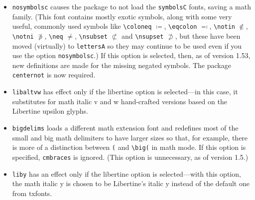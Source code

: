 \documentclass[\fsc]{article}
\theoremstyle{oldplain}
\theoremstyle{plain}
\begin{document}
\begin{itemize}
\item {\tt nosymbolsc} causes the package to not load the {\tt symbolsC} fonts, saving  a math family. (This font contains mostly exotic symbols, along with some very useful, commonly used symbols like \verb|\coloneq| $\coloneq$, \verb|\eqcolon| $\eqcolon$, \verb|\notin| $\notin$, \verb|\notni| $\notni$, \verb|\neq| $\neq$, \verb|\nsubset| $\nsubset$ and \verb|\nsupset| $\nsupset$, but these have been moved (virtually) to {\tt lettersA} so they may continue to be used even if you use the option {\tt nosymbolsc}.) If this option is selected, then, as of version 1.53, new definitions are made for the missing negated symbols. The package {\tt centernot} is now required.
\item {\tt libaltvw} has effect only if the libertine option is selected---in this case, it substitutes for math italic v and w hand-crafted versions based on the Libertine upsilon glyphs.
\item{\tt bigdelims} loads a different math extension font and redefines most of the small and big math delimiters to have larger sizes so that, for example, there is more of a distinction between \verb|(| and \verb|\big(| in math mode. If this option is specified, {\tt cmbraces} is ignored. (This option is unnecessary, as of version 1.5.)
\item{\tt liby} has an effect only if the libertine option is selected---with this option, the math italic y is chosen to be Libertine's italic y instead of the default one from txfonts.

\end{itemize}
\end{document}
